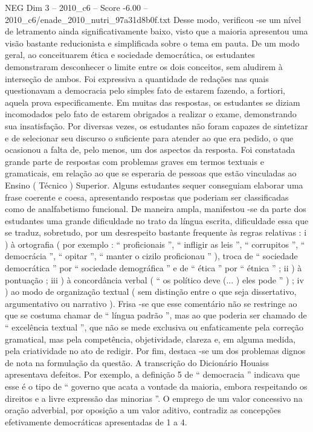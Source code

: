 \begin{textsample}{NEG Dim 3 – 2010\_c6 – Score -6.00 – 2010\_c6/enade\_2010\_nutri\_97a31d8b0f.txt}
Desse modo, verificou -se um nível de letramento ainda significativamente baixo, visto que a maioria apresentou uma visão bastante reducionista e simplificada sobre o tema em pauta.
De um modo geral, ao conceituarem ética e sociedade democrática, os estudantes demonstraram desconhecer o limite entre os dois conceitos, sem aludirem à interseção de ambos.
Foi expressiva a quantidade de redações nas quais questionavam a democracia pelo simples fato de estarem fazendo, a fortiori, aquela prova especificamente.
Em muitas das respostas, os estudantes se diziam incomodados pelo fato de estarem obrigados a realizar o exame, demonstrando sua insatisfação.
Por diversas vezes, os estudantes não foram capazes de sintetizar e de selecionar seu discurso o suficiente para atender ao que era pedido, o que ocasionou a falta de, pelo menos, um dos aspectos da resposta.
Foi constatada grande parte de respostas com problemas graves em termos textuais e gramaticais, em relação ao que se esperaria de pessoas que estão vinculadas ao Ensino ( Técnico ) Superior.
Alguns estudantes sequer conseguiam elaborar uma frase coerente e coesa, apresentando respostas que poderiam ser classificadas como de analfabetismo funcional.
De maneira ampla, manifestou -se da parte dos estudantes uma grande dificuldade no trato da língua escrita, dificuldade essa que se traduz, sobretudo, por um desrespeito bastante frequente às regras relativas : i ) à ortografia ( por exemplo : “ proficionais ”, “ infligir as leis ”, “ corrupitos ”, “ democrácia ”, “ opitar ”, “ manter o cizilo proficionau ” ), troca de “ sociedade democrática ” por “ sociedade demográfica ” e de “ ética ” por “ étnica ” ; ii ) à pontuação ; iii ) à concordância verbal ( “ os político deve (... ) eles pode ” ) ; iv ) ao modo de organização textual ( sem distinção entre o que seja dissertativo, argumentativo ou narrativo ).
Frisa -se que esse comentário não se restringe ao que se costuma chamar de “ língua padrão ”, mas ao que poderia ser chamado de “ excelência textual ”, que não se mede exclusiva ou enfaticamente pela correção gramatical, mas pela competência, objetividade, clareza e, em alguma medida, pela criatividade no ato de redigir.
Por fim, destaca -se um dos problemas dignos de nota na formulação da questão.
A transcrição do Dicionário Houaiss apresentava defeitos.
Por exemplo, a definição 5 de “ democracia ” indicava que esse é o tipo de “ governo que acata a vontade da maioria, embora respeitando os direitos e a livre expressão das minorias ”.
O emprego de um valor concessivo na oração adverbial, por oposição a um valor aditivo, contradiz as concepções efetivamente democráticas apresentadas de 1 a 4.

\end{textsample}
